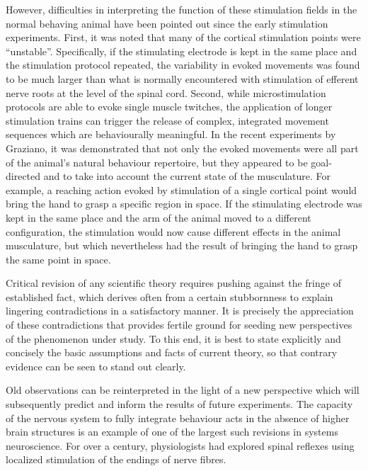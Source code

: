 However, difficulties in interpreting the function of these stimulation fields in the normal behaving animal have been pointed out since the early stimulation experiments. First, it was noted that many of the cortical stimulation points were ``unstable''. Specifically, if the stimulating electrode is kept in the same place and the stimulation protocol repeated, the variability in evoked movements was found to be much larger than what is normally encountered with stimulation of efferent nerve roots at the level of the spinal cord. Second, while microstimulation protocols are able to evoke single muscle twitches, the application of longer stimulation trains can trigger the release of complex, integrated movement sequences which are behaviourally meaningful. In the recent experiments by Graziano, it was demonstrated that not only the evoked movements were all part of the animal's natural behaviour repertoire, but they appeared to be goal-directed and to take into account the current state of the musculature. For example, a reaching action evoked by stimulation of a single cortical point would bring the hand to grasp a specific region in space. If the stimulating electrode was kept in the same place and the arm of the animal moved to a different configuration, the stimulation would now cause different effects in the animal musculature, but which nevertheless had the result of bringing the hand to grasp the same point in space.

Critical revision of any scientific theory requires pushing against the fringe of established fact, which derives often from a certain stubbornness to explain lingering contradictions in a satisfactory manner. It is precisely the appreciation of these contradictions that provides fertile ground for seeding new perspectives of the phenomenon under study. To this end, it is best to state explicitly and concisely the basic assumptions and facts of current theory, so that contrary evidence can be seen to stand out clearly.



Old observations can be reinterpreted in the light of a new perspective which will subsequently predict and inform the results of future experiments. The capacity of the nervous system to fully integrate behaviour acts in the absence of higher brain structures is an example of one of the largest such revisions in systems neuroscience. For over a century, physiologists had explored spinal reflexes using localized stimulation of the endings of nerve fibres.

